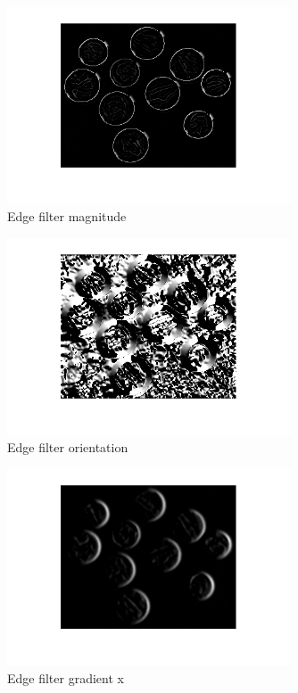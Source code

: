 \documentclass[12pt]{article}
\begin{document}
\subsection{}
\begin{figure}[H] \centering \includegraphics[page=1,width=0.75\textwidth]{edgefilter_im}
\caption{Edge filter magnitude}    \end{figure}   
\begin{figure}[H] \centering \includegraphics[page=1,width=0.75\textwidth]{edgefilter_io}
\caption{Edge filter orientation}    \end{figure}   
\begin{figure}[H] \centering \includegraphics[page=1,width=0.75\textwidth]{edgefilter_ix}
\caption{Edge filter gradient x}    \end{figure}   
\end{document}
